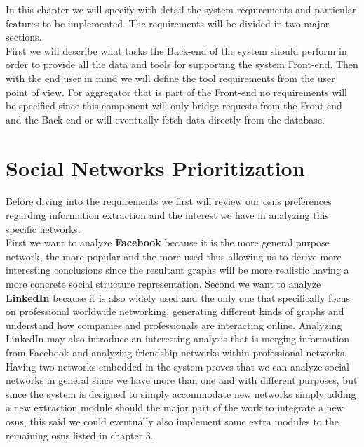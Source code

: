 In this chapter we will specify with detail the system requirements and particular features to be implemented. The requirements
will be divided in two major sections.\\
\indent First we will describe what tasks the Back-end of the system should perform in order to provide
all the data and tools for supporting the system Front-end. Then with the end user in mind we will define the tool requirements from
the user point of view. For aggregator that is part of the Front-end no requirements will be specified since this component will only bridge
requests from the Front-end and the Back-end or will eventually fetch data directly from the database.\\

\section{Social Networks Prioritization}
Before diving into the requirements we first will review our \glspl{osn} preferences regarding information extraction and the
interest we have in analyzing this specific networks.\\
\indent First we want to analyze \textbf{Facebook} because it is the more general purpose network, the more popular and the more used
thus allowing us to derive more interesting conclusions since the resultant graphs will be more realistic having a more concrete social structure
representation. Second we want to analyze \textbf{LinkedIn} because it is also widely used and the only one that specifically
focus on professional worldwide networking, generating different kinds of graphs and understand how companies and professionals
are interacting online. Analyzing LinkedIn may also introduce an interesting analysis that is merging information from Facebook and
analyzing friendship networks within professional networks.\\
\indent Having two networks embedded in the system proves that we can analyze social networks in general since we have more
than one and with different purposes, but since the system is designed to simply accommodate new networks simply adding
a new extraction module should the major part of the work to integrate a new \glspl{osn}, this said we could eventually
also implement some extra modules to the remaining \glspl{osn} listed in chapter 3.




